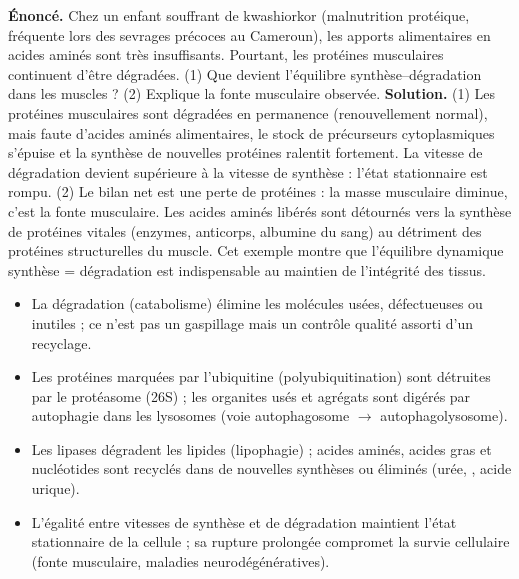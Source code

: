 \documentclass[11pt]{article}
\newcommand{\cle}[1]{{\popxbold\color{popdark}#1}}
\begin{document}
\begin{exoresolu}
\textbf{Énoncé.} Chez un enfant souffrant de kwashiorkor (malnutrition protéique, fréquente lors des sevrages précoces au Cameroun), les apports alimentaires en acides aminés sont très insuffisants. Pourtant, les protéines musculaires continuent d'être dégradées. (1) Que devient l'équilibre synthèse--dégradation dans les muscles ? (2) Explique la fonte musculaire observée.
\tcblower
\textbf{Solution.} (1) Les protéines musculaires sont dégradées en permanence (renouvellement normal), mais faute d'acides aminés alimentaires, le stock de précurseurs cytoplasmiques s'épuise et la synthèse de nouvelles protéines ralentit fortement. La vitesse de dégradation devient supérieure à la vitesse de synthèse : l'état stationnaire est rompu. (2) Le bilan net est une perte de protéines : la masse musculaire diminue, c'est la fonte musculaire. Les acides aminés libérés sont détournés vers la synthèse de protéines vitales (enzymes, anticorps, albumine du sang) au détriment des protéines structurelles du muscle. Cet exemple montre que l'équilibre dynamique synthèse = dégradation est indispensable au maintien de l'intégrité des tissus.
\end{exoresolu}

\begin{aretenir}
\begin{itemize}
\item La dégradation (\cle{catabolisme}) élimine les molécules usées, défectueuses ou inutiles ; ce n'est pas un gaspillage mais un contrôle qualité assorti d'un recyclage.
\item Les protéines marquées par l'\cle{ubiquitine} (polyubiquitination) sont détruites par le \cle{protéasome} (26S) ; les organites usés et agrégats sont digérés par \cle{autophagie} dans les \cle{lysosomes} (voie autophagosome $\to$ autophagolysosome).
\item Les lipases dégradent les lipides (lipophagie) ; acides aminés, acides gras et nucléotides sont recyclés dans de nouvelles synthèses ou éliminés (urée, , acide urique).
\item L'égalité entre vitesses de synthèse et de dégradation maintient l'\cle{état stationnaire} de la cellule ; sa rupture prolongée compromet la survie cellulaire (fonte musculaire, maladies neurodégénératives).
\end{itemize}
\end{aretenir}
\end{document}
